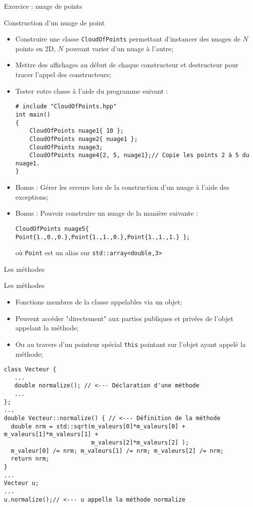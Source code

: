 \documentclass[handout,10pt]{beamer}
\begin{document}
\begin{frame}[fragile]{Exercice : nuage de points}
\tiny
\begin{exampleblock}{Construction d'un nuage de point}
\begin{itemize}
\item Construire une classe \lstinline$CloudOfPoints$ permettant d'instancer des nuages de $N$ points en 2D, $N$ pouvant varier d'un nuage à l'autre;
\item Mettre des affichages au début de chaque constructeur et destructeur pour tracer l'appel des constructeurs;
\item Tester votre classe à l'aide du programme suivant :
\begin{lstlisting}
# include "CloudOfPoints.hpp"
int main()
{
    CloudOfPoints nuage1{ 10 };
    CloudOfPoints nuage2{ nuage1 };
    CloudOfPoints nuage3;
    CloudOfPoints nuage4{2, 5, nuage1};// Copie les points 2 à 5 du nuage1.
}
\end{lstlisting}
\item Bonus : Gérer les erreurs lors de la construction d'un nuage à l'aide des exceptions;
\item Bonus : Pouvoir construire un nuage de la manière suivante :
\begin{lstlisting}
CloudOfPoints nuage5{ Point{1.,0.,0.},Point{1.,1.,0.},Point{1.,1.,1.} };
\end{lstlisting}
où \lstinline$Point$ est un alias sur \lstinline$std::array<double,3>$
\end{itemize}
\end{exampleblock}
\end{frame}

\begin{frame}[fragile]{Les méthodes}
\tiny
\begin{block}{Les méthodes}
\begin{itemize}
\item Fonctions membres de la classe appelables via un objet;
\item Peuvent accèder "directement" aux parties publiques et privées de l'objet appelant la méthode;
\item Ou au travers d'un pointeur spécial \lstinline{this} pointant sur l'objet ayant appelé la méthode;
\end{itemize}
\end{block}

\begin{lstlisting}
class Vecteur {
   ...
   double normalize(); // <--- Déclaration d'une méthode
   ...
};
...
double Vecteur::normalize() { // <--- Définition de la méthode
  double nrm = std::sqrt(m_valeurs[0]*m_valeurs[0] + m_valeurs[1]*m_valeurs[1] +
                         m_valeurs[2]*m_valeurs[2] );
  m_valeur[0] /= nrm; m_valeurs[1] /= nrm; m_valeurs[2] /= nrm;
  return nrm;
}    
...
Vecteur u;
...
u.normalize();// <--- u appelle la méthode normalize
\end{lstlisting}
\end{frame}
\end{document}
